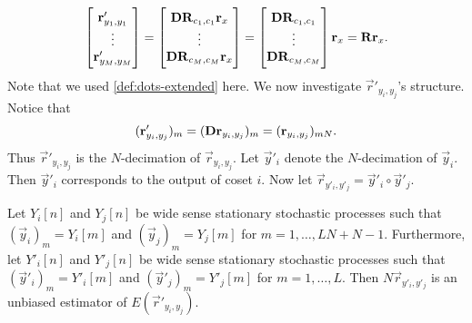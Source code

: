 \documentclass[a4paper, openany, oneside]{memoir}
\begin{document}
\begin{align*}
    \begin{bmatrix}
        \boldsymbol{\mathbf{r}}'_{y_1,y_1} \\
        \vdots \\
        \boldsymbol{\mathbf{r}}'_{y_M,y_M}
    \end{bmatrix}
    = \begin{bmatrix}
        \boldsymbol{\mathbf{D}}\boldsymbol{\mathbf{R}}_{c_1,c_1} \boldsymbol{\mathbf{r}}_x \\
        \vdots \\
        \boldsymbol{\mathbf{D}}\boldsymbol{\mathbf{R}}_{c_M,c_M} \boldsymbol{\mathbf{r}}_x
    \end{bmatrix}
    = \begin{bmatrix}
        \boldsymbol{\mathbf{D}}\boldsymbol{\mathbf{R}}_{c_1,c_1}\\
        \vdots \\
        \boldsymbol{\mathbf{D}}\boldsymbol{\mathbf{R}}_{c_M,c_M}
    \end{bmatrix} \boldsymbol{\mathbf{r}}_x
    = \boldsymbol{\mathbf{R}} \boldsymbol{\mathbf{r}}_x.
\end{align*}
Note that we used \cref{def:dots-extended} here. We now investigate $\vec{r}'_{y_i,y_j}$'s structure. Notice that
\begin{align*}
    (\boldsymbol{\mathbf{r}}'_{y_i,y_j})_m = (\boldsymbol{\mathbf{D}} \boldsymbol{\mathbf{r}}_{y_i,y_j})_{m} = (\boldsymbol{\mathbf{r}}_{y_i,y_j})_{mN}.
\end{align*}
Thus $\vec{r}'_{y_i,y_j}$ is the $N$-decimation of $\vec{r}_{y_i,y_j}$. Let $\vec{y}'_i$ denote the $N$-decimation of $\vec{y}_i$. Then $\vec{y}'_i$ corresponds to the output of coset $i$. Now let $\vec{r}_{y'_i,y'_j} = \vec{y}'_i \circ \vec{y}'_j$.

\begin{blockTheorem} 
    Let $Y_i[n]$ and $Y_j[n]$ be wide sense stationary stochastic processes such that $(\vec{y}_i)_m = Y_i[m]$ and $(\vec{y}_j)_m = Y_j[m]$ for $m=1,\ldots,LN+N-1$. Furthermore, let $Y'_i[n]$ and $Y'_j[n]$ be wide sense stationary stochastic processes such that $(\vec{y}'_i)_m = Y'_i[m]$ and $(\vec{y}'_j)_m = Y'_j[m]$ for $m=1,\ldots,L$. Then $N\vec{r}_{y'_i,y'_j}$ is an unbiased estimator of $E( \vec{r}'_{y_i,y_j})$.
\end{blockTheorem}
\end{document}
